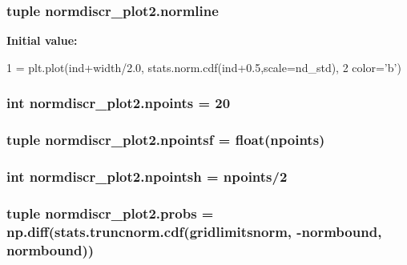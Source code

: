 \subsubsection[{normline}]{\setlength{\rightskip}{0pt plus 5cm}tuple normdiscr\+\_\+plot2.\+normline}\label{namespacenormdiscr__plot2_a55c7317cc02371eb982a60573ed2a46f}
{\bfseries Initial value\+:}
\begin{DoxyCode}
1 = plt.plot(ind+width/2.0, stats.norm.cdf(ind+0.5,scale=nd\_std),
2                     color=\textcolor{stringliteral}{'b'})
\end{DoxyCode}
\hypertarget{namespacenormdiscr__plot2_a5eedafe3a4e06177c196101c8886ba1f}{}
\subsubsection[{npoints}]{\setlength{\rightskip}{0pt plus 5cm}int normdiscr\+\_\+plot2.\+npoints = 20}\label{namespacenormdiscr__plot2_a5eedafe3a4e06177c196101c8886ba1f}
\hypertarget{namespacenormdiscr__plot2_abb90b23055cbc2713f40e135104e4a54}{}
\subsubsection[{npointsf}]{\setlength{\rightskip}{0pt plus 5cm}tuple normdiscr\+\_\+plot2.\+npointsf = float({\bf npoints})}\label{namespacenormdiscr__plot2_abb90b23055cbc2713f40e135104e4a54}
\hypertarget{namespacenormdiscr__plot2_ae9b2c28b1212df96f1a41fd298ad4390}{}
\subsubsection[{npointsh}]{\setlength{\rightskip}{0pt plus 5cm}int normdiscr\+\_\+plot2.\+npointsh = {\bf npoints}/2}\label{namespacenormdiscr__plot2_ae9b2c28b1212df96f1a41fd298ad4390}
\hypertarget{namespacenormdiscr__plot2_a5548df286332e74becd4b4e305f43984}{}
\subsubsection[{probs}]{\setlength{\rightskip}{0pt plus 5cm}tuple normdiscr\+\_\+plot2.\+probs = {\bf np.\+diff}(stats.\+truncnorm.\+cdf({\bf gridlimitsnorm}, -\/{\bf normbound}, {\bf normbound}))}\label{namespacenormdiscr__plot2_a5548df286332e74becd4b4e305f43984}
\hypertarget{namespacenormdiscr__plot2_ae6ee99a8c52300b90e4de7fc466ebfe9}{}
